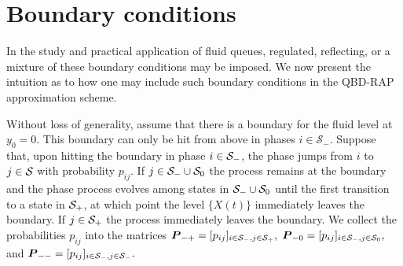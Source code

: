 %


\section{Boundary conditions}\label{sec: boundary conditions}
In the study and practical application of fluid queues, regulated, reflecting, or a mixture of these boundary conditions may be imposed. We now present the intuition as to how one may include such boundary conditions in the QBD-RAP approximation scheme. 

Without loss of generality, assume that there is a boundary for the fluid level at \(y_0 = 0\). This boundary can only be hit from above in phases \(i\in\mathcal S_-\). %
Suppose that, upon hitting the boundary in phase \(i\in\mathcal{S}_-\), the phase jumps from \(i\) to \(j\in\mathcal{S}\) with probability \(p_{ij}\). If \(j\in\mathcal{S}_-\cup\mathcal{S}_0\) the process remains at the boundary and the phase process evolves among states in \(\mathcal{S}_-\cup\mathcal{S}_0\) until the first transition to a state in \(\mathcal{S}_+\), at which point the level \(\{X(t)\}\) immediately leaves the boundary. If \(j\in\mathcal{S}_+\) the process immediately leaves the boundary. 
We collect the probabilities \(p_{ij}\) into the matrices \(\boldsymbol P_{-+} = [p_{ij}]_{i\in\mathcal{S}_-,j\in\mathcal{S}_+},\) \(\boldsymbol P_{-0} = [p_{ij}]_{i\in\mathcal{S}_-,j\in\mathcal{S}_0},\) and \(\boldsymbol P_{--} = [p_{ij}]_{i\in\mathcal{S}_-,j\in\mathcal{S}_-}.\)

